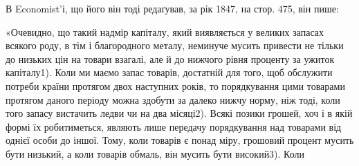 В Economist’і, що його він тоді редаґував, за рік 1847, на стор. 475,
він пише:

«Очевидно, що такий надмір капіталу, який виявляється у великих запасах
всякого роду, в тім і благородного металу, неминуче мусить привести не тільки
до низьких цін на товари взагалі, але й до нижчого рівня проценту за ужиток
капіталу1). Коли ми маємо запас товарів, достатній для того, щоб обслужити
потреби країни протягом двох наступних років, то порядкування цими
товарами протягом даного періоду можна здобути за далеко нижчу норму, ніж
тоді, коли того запасу вистачить ледви чи на два місяці2). Всякі позики грошей,
хоч і в якій формі їх робитиметься, являють лише передачу порядкування над
товарами від однієї особи до іншої. Тому, коли товарів є понад міру, грошовий
процент мусить бути низький, а коли товарів обмаль, він мусить бути високий3). Коли
\parbreak{}  %

